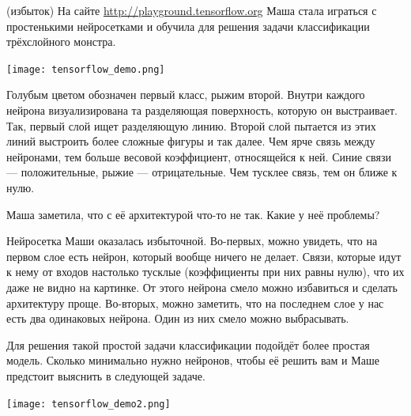 

\newpage

\begin{problem}{(избыток)}
На сайте \url{http://playground.tensorflow.org} Маша стала играться с простенькими нейросетками и  обучила для решения задачи классификации трёхслойного монстра. 

\begin{center} 
\texttt{[image: tensorflow\_demo.png]}
\end{center} 

Голубым цветом обозначен первый класс, рыжим второй. Внутри каждого нейрона визуализирована та разделяющая поверхность, которую он выстраивает. Так, первый слой ищет разделяющую линию. Второй слой пытается из этих линий выстроить более сложные фигуры и так далее. Чем ярче связь между нейронами, тем больше весовой коэффициент, относящейся к ней. Синие связи --- положительные, рыжие --- отрицательные. Чем тусклее связь, тем он ближе к нулю.

Маша заметила, что с её архитектурой что-то не так. Какие у неё проблемы?
\end{problem} 

\begin{sol}
Нейросетка Маши оказалась избыточной. Во-первых, можно увидеть, что на первом слое есть нейрон, который вообще ничего не делает. Связи, которые идут к нему от входов настолько тусклые (коэффициенты при них равны нулю), что их даже не видно на картинке. От этого нейрона смело можно избавиться и сделать архитектуру проще.  Во-вторых, можно заметить, что на последнем слое у нас есть два одинаковых нейрона. Один из них смело можно выбрасывать. 

Для решения такой простой задачи классификации подойдёт более простая модель. Сколько минимально нужно нейронов, чтобы её решить вам и Маше предстоит выяснить в следующей задаче. 

\begin{center} 
\texttt{[image: tensorflow\_demo2.png]}
\end{center} 
\end{sol}


